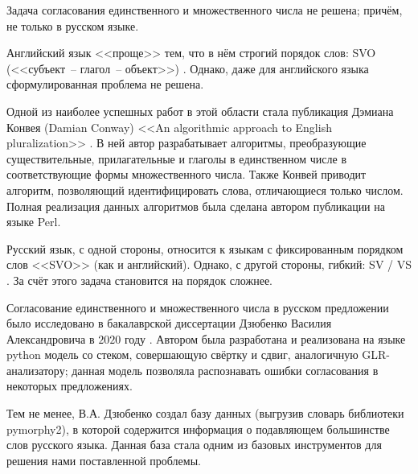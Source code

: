 \documentclass[main]{subfiles}
\begin{document}
Задача согласования единственного и множественного числа не решена; причём, не только в русском языке.

Английский язык <<проще>> тем, что в нём строгий порядок слов: SVO (<<субъект~-- глагол~-- объект>>) \cite{synt}. Однако, даже для английского языка сформулированная проблема не решена. 

Одной из наиболее успешных работ в этой области стала публикация Дэмиана Конвея (Damian Conway) <<An algorithmic approach to English pluralization>> \cite{plur}. В ней автор разрабатывает алгоритмы, преобразующие существительные, прилагательные и глаголы в единственном числе в соответствующие формы множественного числа. Также Конвей приводит алгоритм, позволяющий идентифицировать слова, отличающиеся только числом. Полная реализация данных алгоритмов была сделана автором публикации на языке Perl.

Русский язык, с одной стороны, относится к языкам с фиксированным порядком слов <<SVO>> (как и английский). Однако, с другой стороны, гибкий: SV / VS \cite{ox}. За счёт этого задача становится на порядок сложнее. 

Согласование единственного и множественного числа в русском предложении было исследовано в бакалаврской диссертации Дзюбенко Василия Александровича в $2020$ году \cite{dz}. Автором была разработана и реализована на языке python модель со стеком, совершающую свёртку и сдвиг, аналогичную GLR-анализатору; данная модель позволяла распознавать ошибки согласования в некоторых предложениях.

Тем не менее, В.А. Дзюбенко создал базу данных (выгрузив словарь библиотеки pymorphy2\cite{pym}), в которой содержится информация о подавляющем большинстве слов русского языка. Данная база стала одним из базовых инструментов для решения нами поставленной проблемы.
\end{document}

